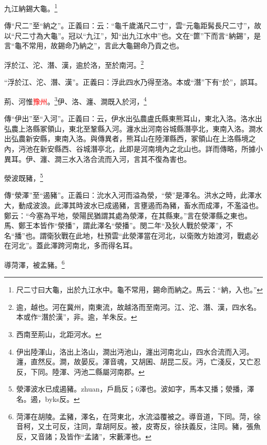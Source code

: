九江納錫大龜。\footnote{尺二寸曰大龜，出於九江水中。龜不常用，錫命而納之。馬云：“納，入也。”}

{\noindent\zhuan{}\fzbyks 傳“尺二”至“納之”。正義曰：云：“龜千歲滿尺二寸”，雲“元龜距髯長尺二寸”，故以“尺二寸為大龜”。冠以“九江”，知“出九江水中”也。文在“篚”下而言“納錫”，是言“龜不常用，故錫命乃納之”，言此大龜錫命乃貢之也。 \par}

浮於江、沱、潛、漢，逾於洛，至於南河。\footnote{逾，越也。河在冀州，南東流，故越洛而至南河。江、沱、潛、漢，四水名。本或作“潛於漢”，非。逾，羊朱反。}

{\noindent\shu{}\fzkt “浮於江、沱、潛、漢”。正義曰：浮此四水乃得至洛。本或“潛”下有“於”，誤耳。 \par}

荊、河惟\textcolor{red}{豫州}。\footnote{西南至荊山，北距河水。}伊、洛、瀍、澗既入於河，\footnote{伊出陸渾山，洛出上洛山，澗出沔池山，瀍出河南北山，四水合流而入河。瀍，直然反。澗，故晏反。渾音魂，又胡囷、胡昆二反。沔，亡淺反，又亡忍反，下同。陸渾、沔池二縣屬河南郡。}

{\noindent\zhuan{}\fzbyks 傳“伊出”至“入河”。正義曰：云，伊水出弘農盧氏縣東熊耳山，東北入洛。洛水出弘農上洛縣冢領山，東北至鞏縣入河。瀍水出河南谷城縣潛亭北，東南入洛。澗水出弘農新安縣，東南入洛。與傳異者，熊耳山在陸渾縣西，冢領山在上洛縣境之內，沔池在新安縣西、谷城潛亭北，此即是河南境內之北山也。詳而傳略，所據小異耳。伊、瀍、澗三水入洛合流而入河，言其不復為害也。 \par}

滎波既豬，\footnote{滎澤波水已成遏豬。zhuan，戶扃反；6澤也。波如字，馬本又播；滎播，澤名。遏，byks反。}

{\noindent\shu{}\fzkt 傳“滎澤”至“遏豬”。正義曰：沇水入河而溢為滎，“滎”是澤名。洪水之時，此澤水大，動成波浪。此澤其時波水已成遏豬，言壅遏而為豬，畜水而成澤，不濫溢也。鄭云：“今塞為平地，滎陽民猶謂其處為滎澤，在其縣東。”言在滎澤縣之東也。馬、鄭王本皆作“滎播”，謂此澤名“滎播”。閔二年“及狄人戰於滎澤”，不名“播”也。謂衛狄戰在此地，杜預雲“此滎澤當在河北，以衛敗方始渡河，戰處必在河北”。蓋此澤跨河南北，多而得名耳。 \par}

導菏澤，被孟豬。\footnote{菏澤在胡陵。孟豬，澤名，在菏東北，水流溢覆被之。導音道，下同。菏，徐音柯，又土可反，注同，韋胡阿反。被，皮寄反，徐扶義反，注同。豬，張魚反，又音諸；及皆作“孟諸”，宋藪澤也。}

